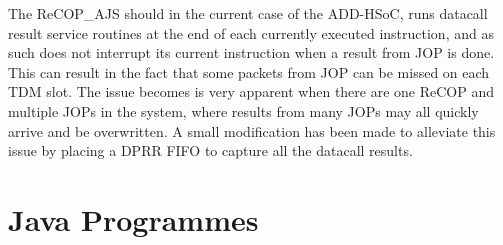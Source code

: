 \documentclass[]{article}
\begin{document}
	The ReCOP\_AJS should in the current case of the ADD-HSoC, runs datacall result service routines at the end of each currently executed instruction, and as such does not interrupt its current instruction when a result from JOP is done. This can result in the fact that some packets from JOP can be missed on each TDM slot. The issue becomes is very apparent when there are one ReCOP and multiple JOPs in the system, where results from many JOPs may all quickly arrive and be overwritten. A small modification has been made to alleviate this issue by placing a DPRR FIFO to capture all the datacall results.
	
	
	\section{Java Programmes}
	
\end{document}
